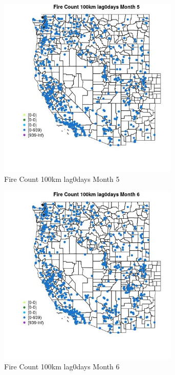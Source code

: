 \begin{figure} 
\centering  
\includegraphics[width=0.77\textwidth]{Code_Outputs/Report_ML_input_PM25_Step4_part_e_de_duplicated_aves_compiled_2019-05-21wNAs_MapObsMo5Fire_Count_100km_lag0days.jpg} 
\caption{\label{fig:Report_ML_input_PM25_Step4_part_e_de_duplicated_aves_compiled_2019-05-21wNAsMapObsMo5Fire_Count_100km_lag0days}Fire Count 100km lag0days Month 5} 
\end{figure} 
 

\begin{figure} 
\centering  
\includegraphics[width=0.77\textwidth]{Code_Outputs/Report_ML_input_PM25_Step4_part_e_de_duplicated_aves_compiled_2019-05-21wNAs_MapObsMo6Fire_Count_100km_lag0days.jpg} 
\caption{\label{fig:Report_ML_input_PM25_Step4_part_e_de_duplicated_aves_compiled_2019-05-21wNAsMapObsMo6Fire_Count_100km_lag0days}Fire Count 100km lag0days Month 6} 
\end{figure} 
 

